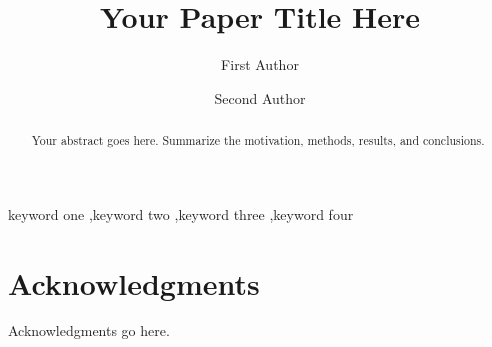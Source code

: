 \documentclass[preprint,twocolumn]{elsarticle}
\begin{document}
\begin{frontmatter}
\title{Your Paper Title Here}

\author[1]{First Author}
\author[1]{Second Author}




\begin{abstract}
Your abstract goes here. Summarize the motivation, methods, results, and conclusions.
\end{abstract}

\begin{keyword}
keyword one \sep keyword two \sep keyword three \sep keyword four
\end{keyword}

\end{frontmatter}











% 


\section*{Acknowledgments}

Acknowledgments go here.




\end{document}
